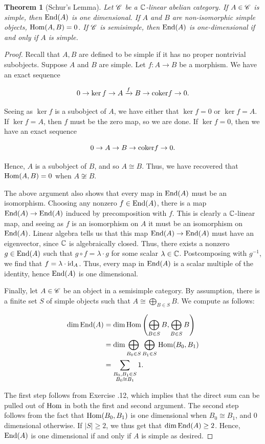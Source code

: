 \documentclass{article}
\newtheorem{theorem}{Theorem}[section]
\theoremstyle{definition}
\numberwithin{figure}{section}
\begin{document}
\begin{theorem}[Schur's Lemma]\label{Schurs Lemma} Let $\mathscr{C}$ be a $\mathbb{C}$-linear abelian category. If $A\in \mathscr{C}$ is simple, then $\mathrm{End}(A)$ is one dimensional. If $A$ and $B$ are non-isomorphic simple objects, $\mathrm{Hom}(A,B)=0$. If $\mathscr{C}$ is semisimple, then $\mathrm{End}(A)$ is one-dimensional if and only if $A$ is simple.
\end{theorem}
\begin{proof} Recall that $A,B$ are defined to be simple if it has no proper nontrivial subobjects. Suppose $A$ and $B$ are simple. Let $f:A\to B$ be a morphism. We have an exact sequence

$$0\to \ker f \to A\xrightarrow{f} B\to \mathrm{coker} f\to 0.$$

 Seeing as $\ker f$ is a subobject of $A$, we have either that $\ker f= 0$ or $\ker f = A$. If $\ker f = A$, then $f$ must be the zero map, so we are done. If $\ker f =0$, then we have an exact sequence

$$0\to A\to B\to \mathrm{coker} f\to 0.$$

Hence, $A$ is a subobject of $B$, and so $A\cong B$. Thus, we have recovered that $\mathrm{Hom}(A,B)=0$ when $A\not\cong B$.

The above argument also shows that every map in $\mathrm{End}(A)$ must be an isomorphism. Choosing any nonzero $f\in \mathrm{End}(A)$, there is a map $\mathrm{End}(A)\to \mathrm{End}(A)$ induced by precomposition with $f$. This is clearly a $\mathbb{C}$-linear map, and seeing as $f$ is an isomorphism on $A$ it must be an isomorphism on $\mathrm{End}(A)$. Linear algebra tells us that this map $\mathrm{End}(A)\to \mathrm{End}(A)$ must have an eigenvector, since $\mathbb{C}$ is algebraically closed. Thus, there exists a nonzero $g\in \mathrm{End}(A)$ such that $g\circ f=\lambda \cdot g$ for some scalar $\lambda\in \mathbb{C}$. Postcomposing with $g^{-1}$, we find that $f=\lambda \cdot\mathrm{id}_A$. Thus, every map in $\mathrm{End}(A)$ is a scalar multiple of the identity, hence $\mathrm{End}(A)$ is one dimensional.

Finally, let $A\in \mathscr{C}$ be an object in a semisimple category. By assumption, there is a finite set $S$ of simple objects such that $A\cong \bigoplus_{B\in S}B$. We compute as follows:

\begin{align*}
\dim \mathrm{End}(A)&=\dim \mathrm{Hom}\left(\bigoplus_{B\in S}B,\bigoplus_{B\in S} B\right)\\
&=\dim \bigoplus_{B_0 \in S}\bigoplus_{B_1\in S}\mathrm{Hom}(B_0,B_1)\\
&=\sum_{\substack{B_0,B_1\in S \\ B_0\cong B_1}}1.
\end{align*}

The first step follows from Exercise \thesection.12, which implies that the direct sum can be pulled out of $\mathrm{Hom}$ in both the first and second argument. The second step follows from the fact that $\mathrm{Hom}(B_0,B_1)$ is one dimensional when $B_0\cong B_1$, and $0$ dimensional otherwise. If $|S|\geq 2$, we thus get that $\dim \mathrm{End}(A)\geq 2$. Hence, $\mathrm{End}(A)$ is one dimensional if and only if $A$ is simple as desired.
\end{proof}
\end{document}
